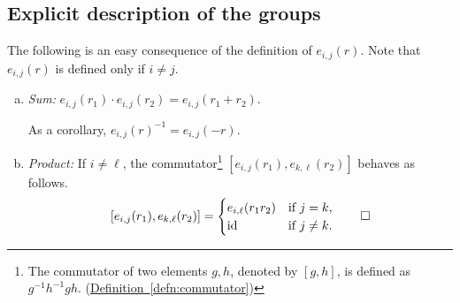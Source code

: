 \documentclass[11pt]{article}
\newcommand{\expref}[2]{\texorpdfstring{\hyperref[#2]{#1~\ref{#2}}}{#1~\ref{#2}}}
\begin{document}
\subsection{Explicit description of the groups}

The following is an easy consequence of the definition of
$e_{i,j}(r)$. Note that $e_{i,j}(r)$ is defined only if $i \neq j$. 

\begin{observation}\label{obs:comm-generators}

  \begin{enumerate}[(a)]
    \item\label{item:comm-gen-sum} \emph{Sum:} $e_{i,j}(r_1) \cdot e_{i,j}(r_2) =
      e_{i,j}(r_1 + r_2)$.

      As a corollary, $e_{i,j}(r)^{-1} = e_{i,j}(-r)$. 
\item\label{item:comm-gen-product} \emph{Product:} If $i \neq \ell$, the commutator\footnote{The commutator of two elements $g,h$,
 denoted by $[g,h]$, %
 is defined as $g^{-1} h^{-1} g h$. (\expref{Definition}{defn:commutator})
}
       $[e_{i,j}(r_1),e_{k,\ell}(r_2)]$ behaves as follows.
  \[
    [e_{i,j}(r_1),e_{k,\ell}(r_2)] = 
    \begin{cases}
      e_{i,\ell}(r_1r_2) & \text{if $j = k$},\\
      \mathrm{id} & \text{if $j \neq k$}.
    \end{cases}\qedhere
  \]
  \end{enumerate}
\end{observation}
\end{document}
